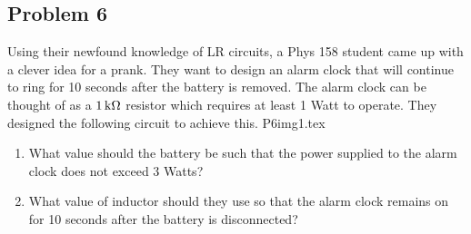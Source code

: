 \subsection*{Problem 6}
Using their newfound knowledge of LR circuits, a Phys 158 student came up with a clever idea for a prank. They want to design an alarm clock that will continue to ring for 10 seconds after the battery is removed. The alarm clock can be thought of as a $1\,\mathrm{k\Omega}$ resistor which requires at least 1 Watt to operate. They designed the following circuit to achieve this.
{P6img1.tex}
\begin{enumerate}
\item What value should the battery be such that the power supplied to the alarm clock does not exceed 3 Watts?
\item What value of inductor should they use so that the alarm clock remains on for 10 seconds after the battery is disconnected?
\end{enumerate}

